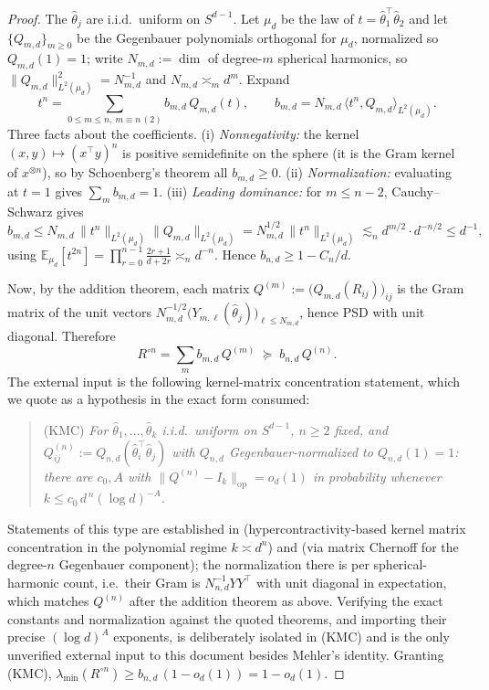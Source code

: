 \documentclass[11pt]{article}
\theoremstyle{remark}
\newcommand{\E}{\mathbb{E}}
\newcommand{\lmin}{\lambda_{\min}}
\newcommand{\op}[1]{\lVert #1 \rVert_{\mathrm{op}}}
\begin{document}
\begin{proof}
The $\hat\theta_j$ are i.i.d.\ uniform on $S^{d-1}$. Let $\mu_d$ be the law of $t = \hat\theta_1^\top\hat\theta_2$ and let $\{Q_{m,d}\}_{m\ge0}$ be the Gegenbauer polynomials orthogonal for $\mu_d$, normalized so $Q_{m,d}(1) = 1$; write $N_{m,d} := \dim$ of degree-$m$ spherical harmonics, so $\lVert Q_{m,d}\rVert_{L^2(\mu_d)}^2 = N_{m,d}^{-1}$ and $N_{m,d} \asymp_m d^m$. Expand
\[
t^n = \sum_{0 \le m \le n,\ m \equiv n\, (2)} b_{m,d}\, Q_{m,d}(t), \qquad b_{m,d} = N_{m,d}\,\langle t^n, Q_{m,d}\rangle_{L^2(\mu_d)} .
\]
Three facts about the coefficients. (i) \emph{Nonnegativity:} the kernel $(x,y)\mapsto (x^\top y)^n$ is positive semidefinite on the sphere (it is the Gram kernel of $x^{\otimes n}$), so by Schoenberg's theorem all $b_{m,d} \ge 0$. (ii) \emph{Normalization:} evaluating at $t=1$ gives $\sum_m b_{m,d} = 1$. (iii) \emph{Leading dominance:} for $m \le n-2$, Cauchy--Schwarz gives
\[
b_{m,d} \le N_{m,d}\,\lVert t^n\rVert_{L^2(\mu_d)}\lVert Q_{m,d}\rVert_{L^2(\mu_d)} = N_{m,d}^{1/2}\,\lVert t^n\rVert_{L^2(\mu_d)} \lesssim_n d^{m/2}\cdot d^{-n/2} \le d^{-1},
\]
using $\E_{\mu_d}[t^{2n}] = \prod_{r=0}^{n-1}\frac{2r+1}{d+2r} \asymp_n d^{-n}$. Hence $b_{n,d} \ge 1 - C_n/d$.

Now, by the addition theorem, each matrix $Q^{(m)} := \big(Q_{m,d}(R_{ij})\big)_{ij}$ is the Gram matrix of the unit vectors $N_{m,d}^{-1/2}\big(Y_{m,\ell}(\hat\theta_j)\big)_{\ell \le N_{m,d}}$, hence PSD with unit diagonal. Therefore
\[
R^{\circ n} = \sum_m b_{m,d}\, Q^{(m)} \;\succeq\; b_{n,d}\, Q^{(n)} .
\]
The external input is the following kernel-matrix concentration statement, which we quote as a hypothesis in the exact form consumed:
\begin{quote}
(KMC) \emph{For $\hat\theta_1,\dots,\hat\theta_k$ i.i.d.\ uniform on $S^{d-1}$, $n \ge 2$ fixed, and $Q^{(n)}_{ij} := Q_{n,d}(\hat\theta_i^\top\hat\theta_j)$ with $Q_{n,d}$ Gegenbauer-normalized to $Q_{n,d}(1) = 1$: there are $c_0, A$ with $\op{Q^{(n)} - I_k} = o_d(1)$ in probability whenever $k \le c_0\,d^{\,n}(\log d)^{-A}$.}
\end{quote}
Statements of this type are established in \cite{MMM21} (hypercontractivity-based kernel matrix concentration in the polynomial regime $k \asymp d^n$) and \cite{MZ22} (via matrix Chernoff for the degree-$n$ Gegenbauer component); the normalization there is per spherical-harmonic count, i.e.\ their Gram is $N_{n,d}^{-1}YY^\top$ with unit diagonal in expectation, which matches $Q^{(n)}$ after the addition theorem as above. Verifying the exact constants and normalization against the quoted theorems, and importing their precise $(\log d)^A$ exponents, is deliberately isolated in (KMC) and is the only unverified external input to this document besides Mehler's identity. Granting (KMC), $\lmin(R^{\circ n}) \ge b_{n,d}\,(1 - o_d(1)) = 1 - o_d(1)$.
\end{proof}
\end{document}

